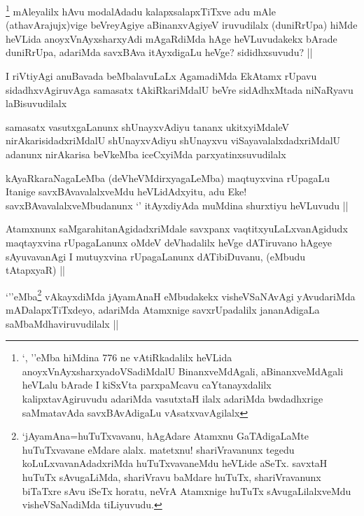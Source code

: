 \begin{artha}
\footnote[2]{`\stext, \stext''eMba hiMdina 776 ne vAtiRkadalilx heVLida anoyxVnAyxsharxyadoVSadiMdalU BinanxveMdAgali, aBinanxveMdAgali heVLalu bArade I kiSxVta parxpaMcavu caYtanayxdalilx kalipxtavAgiruvudu adariMda vasutxtaH ilalx adariMda bwdadhxrige saMmatavAda savxBAvAdigaLu vAsatxvavAgilalx}
mAleyalilx hAvu modalAdadu kalapxsalapxTiTxve adu mAle (athavArajujx)vige beVreyAgiye aBinanxvAgiyeV iruvudilalx (duniRrUpa) hiMde heVLida anoyxVnAyxsharxyAdi mAgaRdiMda hAge heVLuvudakekx bArade duniRrUpa, adariMda savxBAva itAyxdigaLu heVge? sididhxsuvudu? ||
\end{artha}


\begin{artha}
I riVtiyAgi anuBavada beMbalavuLaLx AgamadiMda EkAtamx rUpavu sidadhxvAgiruvAga samasatx tAkiRkariMdalU beVre sidAdhxMtada niNaRyavu laBisuvudilalx
\end{artha}


\begin{artha}
samasatx vasutxgaLanunx shUnayxvAdiyu tananx ukitxyiMdaleV nirAkarisidadxriMdalU shUnayxvAdiyu shUnayxvu viSayavalalxdadxriMdalU adanunx nirAkarisa beVkeMba iceCxyiMda parxyatinxsuvudilalx
\end{artha}


\begin{artha}
kAyaRkaraNagaLeMba (deVheVMdirxyagaLeMba) maqtuyxvina rUpagaLu Itanige savxBAvavalalxveMdu heVLidAdxyitu, adu Eke! savxBAvavalalxveMbudanunx `\stext' itAyxdiyAda muMdina shurxtiyu heVLuvudu ||
\end{artha}


\begin{artha}
Atamxnunx saMgarahitanAgidadxriMdale savxpanx vaqtitxyuLaLxvanAgidudx maqtayxvina rUpagaLanunx oMdeV deVhadalilx heVge dATiruvano hAgeye sAyuvavanAgi I mutuyxvina rUpagaLanunx dATibiDuvanu, (eMbudu tAtapxyaR) ||
\end{artha}

\begin{artha}
`\stext''eMba\footnote[1]{`jAyamAna=huTuTxvavanu, hAgAdare Atamxnu GaTAdigaLaMte huTuTxvavane eMdare alalx. matetxnu! shariVravanunx tegedu koLuLxvavanAdadxriMda huTuTxvavaneMdu heVLide aSeTx. savxtaH huTuTx sAvugaLiMda, shariVravu baMdare huTuTx, shariVravanunx biTaTxre sAvu iSeTx horatu, neVrA Atamxnige huTuTx sAvugaLilalxveMdu visheVSaNadiMda tiLiyuvudu.} vAkayxdiMda jAyamAnaH eMbudakekx visheVSaNAvAgi yAvudariMda mADalapxTiTxdeyo, adariMda Atamxnige savxrUpadalilx jananAdigaLa saMbaMdhaviruvudilalx ||
\end{artha}

